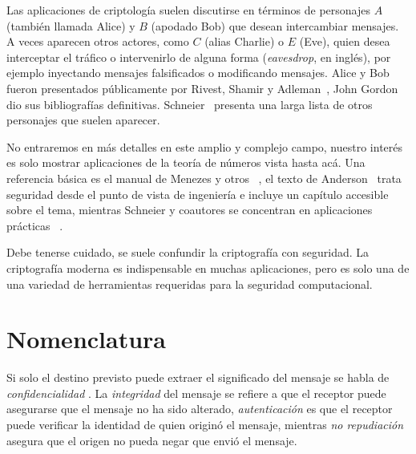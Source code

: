   Las aplicaciones de criptología
  suelen discutirse en términos de personajes
  \(A\) (también llamada \foreignlanguage{english}{Alice})%
  y \(B\) (apodado \foreignlanguage{english}{Bob})%
  que desean intercambiar mensajes.%
  A veces aparecen otros actores,
  como \(C\) (alias \foreignlanguage{english}{Charlie})%
  o \(E\) (\foreignlanguage{english}{Eve}),%
  quien desea interceptar el tráfico
  o intervenirlo de alguna forma
  (\emph{\foreignlanguage{english}{eavesdrop}}, en inglés),
  por ejemplo inyectando mensajes falsificados
  o modificando mensajes.
  Alice y Bob fueron presentados públicamente
  por Rivest, Shamir y Adleman~\cite{rivest83:_RSA},
  John Gordon~%
    \cite{gordon84:_alice_bob_after_dinner_speech}
  dio sus bibliografías definitivas.
  Schneier~\cite{schneier96:_applied_crypt}
  presenta una larga lista de otros personajes que suelen aparecer.

  No entraremos en más detalles en este amplio y complejo campo,
  nuestro interés
  es solo mostrar aplicaciones de la teoría de números
  vista hasta acá.
  Una referencia básica es el manual de Menezes y otros~%
    \cite{menezes96:_handb_applied_crypt},
  el texto de Anderson~%
    \cite{anderson08:_secur_engin}
  trata seguridad desde el punto de vista de ingeniería
  e incluye un capítulo accesible sobre el tema,
  mientras Schneier y coautores
  se concentran en aplicaciones prácticas~%
    \cite{ferguson10:_crypt_engin, schneier96:_applied_crypt}.

  Debe tenerse cuidado,
  se suele confundir la criptografía con seguridad.%
  La criptografía moderna es indispensable en muchas aplicaciones,
  pero es solo una de una variedad de herramientas
  requeridas para la seguridad computacional.

\section{Nomenclatura}
\label{sec:criptologia:nomenclatura}

  Si solo el destino previsto puede extraer el significado del mensaje
  se habla de \emph{confidencialidad}%
    .
  La \emph{integridad} del mensaje%
  se refiere a que el receptor puede asegurarse
  que el mensaje no ha sido alterado,
  \emph{autenticación}%
  es que el receptor puede verificar la identidad de quien originó el mensaje,
  mientras \emph{no repudiación}%
  asegura que el origen no pueda negar que envió el mensaje.

